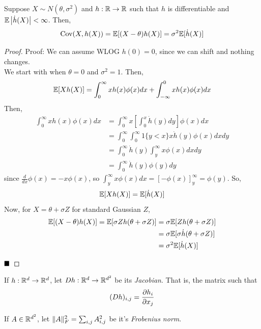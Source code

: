 \begin{theorem}
    Suppose $X \sim N(\theta, \sigma^2)$ and $h : \mathbb{R} \to \mathbb{R}$ such that $h$ is differentiable and $\mathbb{E}\left\lvert {\dot{h}(X)} \right\rvert < \infty$. Then,
    \[ \text{Cov}(X, h(X)) = \mathbb{E}[(X - \theta)h(X)] = \sigma^2\mathbb{E}[\dot{h}(X)] \]
\end{theorem}
\begin{proof}{Proof:}
    We can assume WLOG $h(0) = 0$, since we can shift and nothing changes.\\

    We start with when $\theta = 0$ and $\sigma^2 = 1$. Then,
    \[ \mathbb{E}[Xh(X)] = \int_{0}^{\infty} xh(x)\phi(x) dx + \int_{-\infty}^{0} xh(x)\phi(x) dx \]
    Then,
    \begin{align*}
        \int_{0}^{\infty} xh(x)\phi(x) dx &= \int_{0}^{\infty} x\left[\int_{0}^{x} \dot{h}(y) dy\right]\phi(x) dx\\
        &= \int_{0}^{\infty}\int_{0}^{\infty} 1\{y < x\}x\dot{h}(y)\phi(x) dx dy\\
        &= \int_{0}^{\infty} \dot{h}(y)\int_{y}^{\infty} x\phi(x) dx dy\\
        &= \int_{0}^{\infty} \dot{h}(y)\phi(y) dy
    \end{align*}
    since $\frac{d}{dx}\phi(x) = -x\phi(x)$, so $\int_{y}^{\infty} x\phi(x) dx = [-\phi(x)]_{y}^{\infty} = \phi(y)$.
    So,
    \[ \mathbb{E}[Xh(X)] = \mathbb{E}[\dot{h}(X)] \]
    Now, for $X = \theta + \sigma Z$ for standard Gaussian $Z$,
    \begin{align*}
        \mathbb{E}[(X - \theta)h(X)] = \mathbb{E}[\sigma Zh(\theta + \sigma Z)] &= \sigma\mathbb{E}[Zh(\theta + \sigma Z)]\\
        &= \sigma\mathbb{E}[\sigma\dot{h}(\theta + \sigma Z)]\\
        &= \sigma^2\mathbb{E}[\dot{h}(X)]
    \end{align*}

    $\qed$
\end{proof}

\begin{definition}
    If $h : \mathbb{R}^d \to \mathbb{R}^d$, let $Dh : \mathbb{R}^d \to \mathbb{R}^{d^2}$ be its \textit{Jacobian}. That is, the matrix such that
    \[ (Dh)_{i,j} = \frac{\partial h_i}{\partial x_j} \]
\end{definition}

\begin{definition}
    If $A \in \mathbb{R}^{d^2}$, let $\lVert {A} \rVert_F^2 = \sum_{i, j} A_{i, j}^2$ be it's \emph{Frobenius norm}.
\end{definition}


